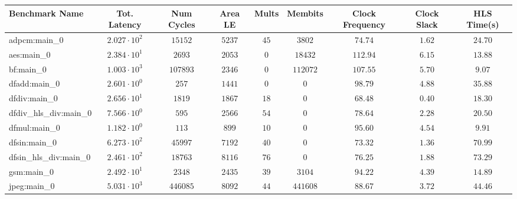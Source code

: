 \begin{tabular}{|l|c|c|c|c|c|c|c|c|}
\hline
Benchmark Name          & Tot. Latency           & Num Cycles & Area LE   & Mults   & Membits    & Clock Frequency & Clock Slack & HLS Time(s) \\
\hline
adpcm:main\_0           & $ 2.027 \cdot 10^{2} $ & $ 15152  $ & $ 5237  $ & $ 45  $ & $ 3802   $ & $ 74.74       $ & $ 1.62    $ & $ 24.70   $ \\
aes:main\_0             & $ 2.384 \cdot 10^{1} $ & $ 2693   $ & $ 2053  $ & $ 0   $ & $ 18432  $ & $ 112.94      $ & $ 6.15    $ & $ 13.88   $ \\
bf:main\_0              & $ 1.003 \cdot 10^{3} $ & $ 107893 $ & $ 2346  $ & $ 0   $ & $ 112072 $ & $ 107.55      $ & $ 5.70    $ & $ 9.07    $ \\
dfadd:main\_0           & $ 2.601 \cdot 10^{0} $ & $ 257    $ & $ 1441  $ & $ 0   $ & $ 0      $ & $ 98.79       $ & $ 4.88    $ & $ 35.88   $ \\
dfdiv:main\_0           & $ 2.656 \cdot 10^{1} $ & $ 1819   $ & $ 1867  $ & $ 18  $ & $ 0      $ & $ 68.48       $ & $ 0.40    $ & $ 18.30   $ \\
dfdiv\_hls\_div:main\_0 & $ 7.566 \cdot 10^{0} $ & $ 595    $ & $ 2566  $ & $ 54  $ & $ 0      $ & $ 78.64       $ & $ 2.28    $ & $ 20.50   $ \\
dfmul:main\_0           & $ 1.182 \cdot 10^{0} $ & $ 113    $ & $ 899   $ & $ 10  $ & $ 0      $ & $ 95.60       $ & $ 4.54    $ & $ 9.91    $ \\
dfsin:main\_0           & $ 6.273 \cdot 10^{2} $ & $ 45997  $ & $ 7192  $ & $ 40  $ & $ 0      $ & $ 73.32       $ & $ 1.36    $ & $ 70.99   $ \\
dfsin\_hls\_div:main\_0 & $ 2.461 \cdot 10^{2} $ & $ 18763  $ & $ 8116  $ & $ 76  $ & $ 0      $ & $ 76.25       $ & $ 1.88    $ & $ 73.29   $ \\
gsm:main\_0             & $ 2.492 \cdot 10^{1} $ & $ 2348   $ & $ 2435  $ & $ 39  $ & $ 3104   $ & $ 94.22       $ & $ 4.39    $ & $ 14.89   $ \\
jpeg:main\_0            & $ 5.031 \cdot 10^{3} $ & $ 446085 $ & $ 8092  $ & $ 44  $ & $ 441608 $ & $ 88.67       $ & $ 3.72    $ & $ 44.46   $ \\

\end{tabular}
